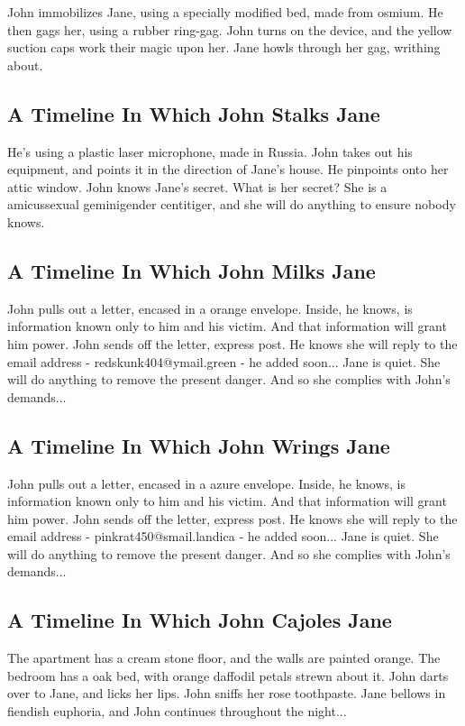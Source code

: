 \documentclass{article}
\begin{document}
John immobilizes Jane, using a specially modified bed, made from osmium.
He then gags her, using a rubber ring{-}gag.
John turns on the device, and the yellow suction caps work their magic upon her.
Jane howls through her gag, writhing about.
\subsection{A Timeline In Which John Stalks Jane}


He's using a plastic laser microphone, made in Russia.
John takes out his equipment, and points it in the direction of Jane's house. He pinpoints onto her attic window.
John knows Jane's secret. What is her secret? She is a amicussexual geminigender centitiger, and she will do anything to ensure nobody knows.
\subsection{A Timeline In Which John Milks Jane}


John pulls out a letter, encased in a orange envelope. Inside, he knows, is information known only to him and his victim. And that information will grant him power.
John sends off the letter, express post. He knows she will reply to the email address {-} redskunk404@ymail.green {-} he added soon...
Jane is quiet. She will do anything to remove the present danger. And so she complies with John's demands...
\subsection{A Timeline In Which John Wrings Jane}


John pulls out a letter, encased in a azure envelope. Inside, he knows, is information known only to him and his victim. And that information will grant him power.
John sends off the letter, express post. He knows she will reply to the email address {-} pinkrat450@smail.landica {-} he added soon...
Jane is quiet. She will do anything to remove the present danger. And so she complies with John's demands...
\subsection{A Timeline In Which John Cajoles Jane}


The apartment has a cream stone floor, and the walls are painted orange.
The bedroom has a oak bed, with orange daffodil petals strewn about it.
John darts over to Jane, and licks her lips.
John sniffs her rose toothpaste.
Jane bellows in fiendish euphoria, and John continues throughout the night...
\end{document}
